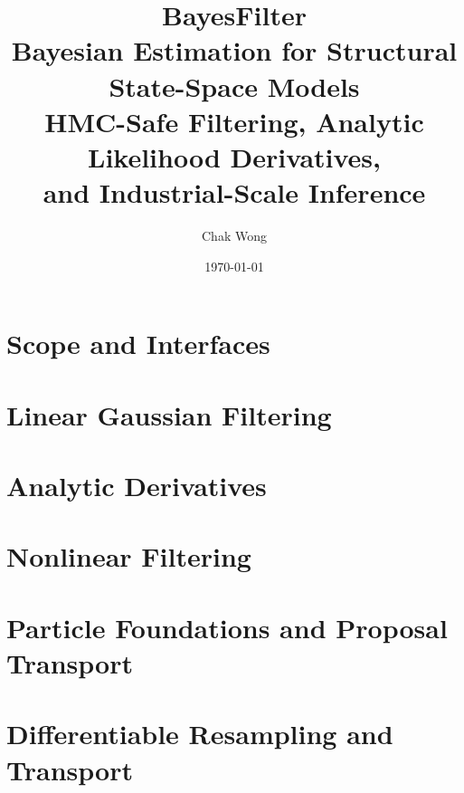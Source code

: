 \documentclass[12pt,a4paper,openany]{book}
\title{\Huge\textbf{BayesFilter}\\[12pt]
  \Large Bayesian Estimation for Structural State-Space Models\\[4pt]
  \large HMC-Safe Filtering, Analytic Likelihood Derivatives,\\
  and Industrial-Scale Inference}
\author{Chak Wong}
\date{\today}
\begin{document}
\frontmatter
\maketitle
\tableofcontents

\mainmatter

\part{Scope and Interfaces}





\part{Linear Gaussian Filtering}





\part{Analytic Derivatives}







\part{Nonlinear Filtering}






\part{Particle Foundations and Proposal Transport}




\part{Differentiable Resampling and Transport}




\end{document}
